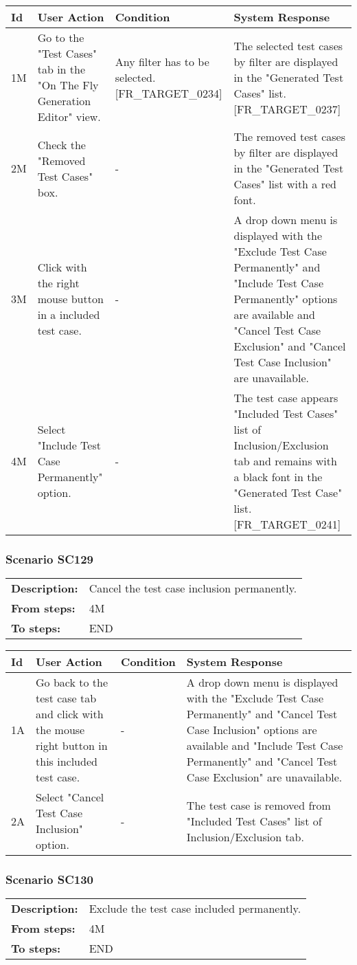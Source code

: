 \documentclass[a4paper,11pt]{article}
\newcommand{\bl}{\\ \hline}
\begin{document}
\begin{tabular}{|p{0.8in}|p{1.6in}|p{1.6in}|p{1.6in}|}
\hline
Id & User Action & Condition & System Response  \bl 
1M & Go to the "Test Cases" tab in the "On The Fly Generation
						Editor" view. & Any filter has to be selected. [FR_TARGET_0234]
					 & The selected test cases by filter are displayed in the
						"Generated Test Cases" list. [FR_TARGET_0237] \bl 
2M & Check the "Removed Test Cases" box. & - & The removed test cases by filter are displayed in the
						"Generated Test Cases" list with a red font. \bl 
3M & Click with the right mouse button in a included test case.
					 & - & A drop down menu is displayed with the "Exclude Test Case
						Permanently" and "Include Test Case Permanently" options are
						available and "Cancel Test Case Exclusion" and "Cancel Test Case
						Inclusion" are unavailable.  \bl 
4M & Select "Include Test Case Permanently" option. & - & The test case appears "Included Test Cases" list of
						Inclusion/Exclusion tab and remains with a black font in the
						"Generated Test Case" list. [FR_TARGET_0241] \bl 
\end{tabular}
\subsubsection*{Scenario SC129}
\begin{tabular}{p{1in}p{4in}}
{\bf Description:} & Cancel the test case inclusion permanently.
				 \\
{\bf From steps:} & 4M \\
{\bf To steps:} & END \\
\end{tabular}
 
\begin{tabular}{|p{0.8in}|p{1.6in}|p{1.6in}|p{1.6in}|}
\hline
Id & User Action & Condition & System Response  \bl 
1A & Go back to the test case tab and click with the mouse right
						button in this included test case. & - & A drop down menu is displayed with the "Exclude Test Case
						Permanently" and "Cancel Test Case Inclusion" options are
						available and "Include Test Case Permanently" and "Cancel Test
						Case Exclusion" are unavailable. \bl 
2A & Select "Cancel Test Case Inclusion" option. & - & The test case is removed from "Included Test Cases" list
						of Inclusion/Exclusion tab. \bl 
\end{tabular}
\subsubsection*{Scenario SC130}
\begin{tabular}{p{1in}p{4in}}
{\bf Description:} & Exclude the test case included permanently.
				 \\
{\bf From steps:} & 4M \\
{\bf To steps:} & END \\
\end{tabular}
 
\end{document}
